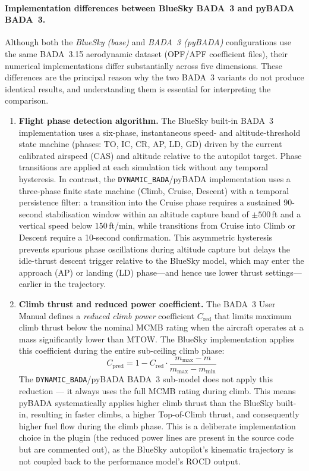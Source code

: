 \paragraph{Implementation differences between BlueSky BADA~3 and pyBADA BADA~3.}
\label{par:bada3_impl_diff}
Although both the \emph{BlueSky (base)} and \emph{BADA~3 (pyBADA)} configurations use the same BADA~3.15 aerodynamic dataset (OPF/APF coefficient files), their numerical implementations differ substantially across five dimensions. These differences are the principal reason why the two BADA~3 variants do not produce identical results, and understanding them is essential for interpreting the comparison.
\begin{enumerate}
    \item \textbf{Flight phase detection algorithm.} The BlueSky built-in BADA~3 implementation uses a six-phase, instantaneous speed- and altitude-threshold state machine (phases: TO, IC, CR, AP, LD, GD) driven by the current calibrated airspeed (CAS) and altitude relative to the autopilot target. Phase transitions are applied at each simulation tick without any temporal hysteresis. In contrast, the \texttt{DYNAMIC\_BADA}/pyBADA implementation uses a three-phase finite state machine (Climb, Cruise, Descent) with a temporal persistence filter: a transition into the Cruise phase requires a sustained 90-second stabilisation window within an altitude capture band of $\pm 500$\,ft and a vertical speed below $150$\,ft/min, while transitions from Cruise into Climb or Descent require a 10-second confirmation. This asymmetric hysteresis prevents spurious phase oscillations during altitude capture but delays the idle-thrust descent trigger relative to the BlueSky model, which may enter the approach (AP) or landing (LD) phase—and hence use lower thrust settings—earlier in the trajectory.

    \item \textbf{Climb thrust and reduced power coefficient.} The BADA~3 User Manual defines a \emph{reduced climb power} coefficient $C_{\text{red}}$ that limits maximum climb thrust below the nominal MCMB rating when the aircraft operates at a mass significantly lower than MTOW. The BlueSky implementation applies this coefficient during the entire sub-ceiling climb phase:
    \begin{equation}
        C_{\text{pred}} = 1 - C_{\text{red}} \cdot \frac{m_{\max} - m}{m_{\max} - m_{\min}}
    \end{equation}
    The \texttt{DYNAMIC\_BADA}/pyBADA BADA~3 sub-model does not apply this reduction — it always uses the full MCMB rating during climb. This means pyBADA systematically applies higher climb thrust than the BlueSky built-in, resulting in faster climbs, a higher Top-of-Climb thrust, and consequently higher fuel flow during the climb phase. This is a deliberate implementation choice in the plugin (the reduced power lines are present in the source code but are commented out), as the BlueSky autopilot's kinematic trajectory is not coupled back to the performance model's ROCD output.


\end{enumerate}
